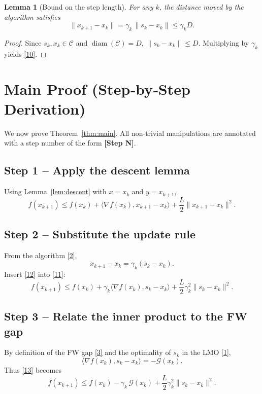 \documentclass[11pt]{article}
\newtheorem{lemma}{Lemma}[section]
\begin{document}
\begin{lemma}[Bound on the step length]
\label{lem:stepbound}
For any $k$, the distance moved by the algorithm satisfies
\[
\|x_{k+1}-x_{k}\| = \gamma_{k}\,\|s_{k}-x_{k}\|\le \gamma_{k} D .
\tag{10}
\]
\end{lemma}
\begin{proof}
Since $s_{k},x_{k}\in\mathcal C$ and $\operatorname{diam}(\mathcal C)=D$,
$\|s_{k}-x_{k}\|\le D$.  Multiplying by $\gamma_{k}$ yields \eqref{10}.
\end{proof}

\section{Main Proof (Step‑by‑Step Derivation)}
\label{sec:proof}
We now prove Theorem~\ref{thm:main}.  All non‑trivial manipulations are
annotated with a step number of the form \textbf{[Step N]}.

\subsection*{Step 1 – Apply the descent lemma}
Using Lemma~\ref{lem:descent} with $x=x_{k}$ and $y=x_{k+1}$,
\[
f(x_{k+1}) \le f(x_{k}) + \langle\nabla f(x_{k}),x_{k+1}-x_{k}\rangle
               + \frac{L}{2}\|x_{k+1}-x_{k}\|^{2}.
\tag{11}
\]

\subsection*{Step 2 – Substitute the update rule}
From the algorithm \eqref{2},
\[
x_{k+1}-x_{k}= \gamma_{k}(s_{k}-x_{k}).
\tag{12}
\]
Insert \eqref{12} into \eqref{11}:
\[
f(x_{k+1}) \le f(x_{k}) + \gamma_{k}\langle\nabla f(x_{k}),s_{k}-x_{k}\rangle
               + \frac{L}{2}\gamma_{k}^{2}\|s_{k}-x_{k}\|^{2}.
\tag{13}
\]

\subsection*{Step 3 – Relate the inner product to the FW gap}
By definition of the FW gap \eqref{3} and the optimality of $s_{k}$ in the
LMO \eqref{1},
\[
\langle\nabla f(x_{k}),s_{k}-x_{k}\rangle = -\mathcal G(x_{k}).
\tag{14}
\]
Thus \eqref{13} becomes
\[
f(x_{k+1}) \le f(x_{k}) - \gamma_{k}\,\mathcal G(x_{k})
               + \frac{L}{2}\gamma_{k}^{2}\|s_{k}-x_{k}\|^{2}.
\tag{15}
\]
\end{document}
